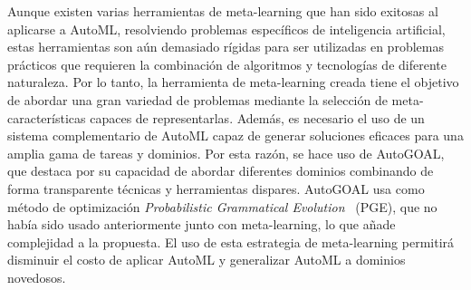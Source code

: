Aunque existen varias herramientas de meta-learning que han sido exitosas al aplicarse a AutoML, resolviendo problemas específicos de inteligencia artificial, estas herramientas son aún demasiado rígidas para ser utilizadas en problemas prácticos que requieren la combinación de algoritmos y tecnologías de diferente naturaleza. Por lo tanto, la herramienta de meta-learning creada tiene el objetivo de abordar una gran variedad de problemas mediante la selección de meta-características capaces de representarlas. Además, es necesario el uso de un sistema complementario de AutoML capaz de generar soluciones eficaces para una amplia gama de tareas y dominios. Por esta razón, se hace uso de AutoGOAL, que destaca por su capacidad de abordar diferentes dominios combinando de forma transparente técnicas y herramientas dispares. AutoGOAL usa como método de optimización \textit{Probabilistic Grammatical Evolution}~\cite{pge2015} (PGE), que no había sido usado anteriormente junto con meta-learning, lo que añade complejidad a la propuesta. El uso de esta estrategia de meta-learning permitirá disminuir el costo de aplicar AutoML y generalizar AutoML a dominios novedosos.

